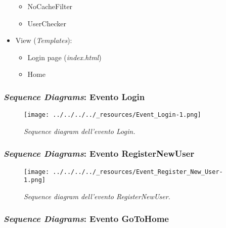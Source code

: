 \begin{itemize}
  \begin{itemize}
  \tightlist
  \item
    NoCacheFilter
  \item
    UserChecker
  \end{itemize}
\item
  View (\emph{Templates}):

  \begin{itemize}
  \tightlist
  \item
    Login page (\emph{index.html})
  \item
    Home
  \end{itemize}
\end{itemize}

\pagebreak

\hypertarget{sequence-diagrams-evento-login}{%
\subsubsection{\texorpdfstring{\emph{Sequence Diagrams}: Evento
Login}{Sequence Diagrams: Evento Login}}\label{sequence-diagrams-evento-login}}

\begin{figure}
\centering
\texttt{[image: ../../../../\_resources/Event\_Login-1.png]}
\caption{\emph{Sequence diagram dell'evento Login.}}
\end{figure}

\pagebreak

\hypertarget{sequence-diagrams-evento-registernewuser}{%
\subsubsection{\texorpdfstring{\emph{Sequence Diagrams}: Evento
RegisterNewUser}{Sequence Diagrams: Evento RegisterNewUser}}\label{sequence-diagrams-evento-registernewuser}}

\begin{figure}
\centering
\texttt{[image: ../../../../\_resources/Event\_Register\_New\_User-1.png]}
\caption{\emph{Sequence diagram dell'evento RegisterNewUser.}}
\end{figure}

\pagebreak

\hypertarget{sequence-diagrams-evento-gotohome}{%
\subsubsection{\texorpdfstring{\emph{Sequence Diagrams}: Evento
GoToHome}{Sequence Diagrams: Evento GoToHome}}\label{sequence-diagrams-evento-gotohome}}

